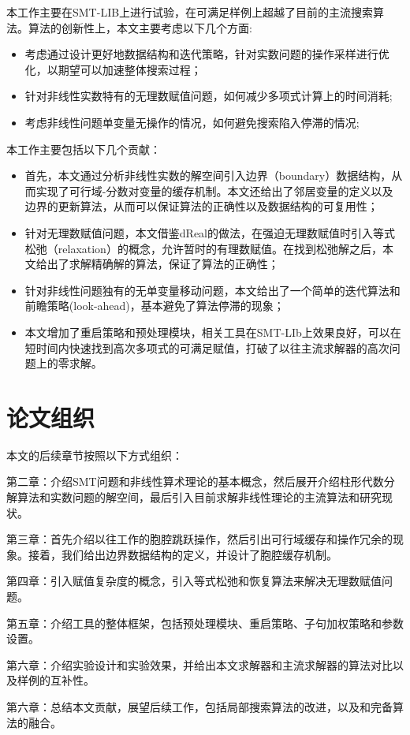 本工作主要在SMT-LIB\cite{BarFT-SMTLIB}上进行试验，在可满足样例上超越了目前的主流搜索算法。算法的创新性上，本文主要考虑以下几个方面:
\begin{itemize}
    \item 考虑通过设计更好地数据结构和迭代策略，针对实数问题的操作采样进行优化，以期望可以加速整体搜索过程；
    \item 针对非线性实数特有的无理数赋值问题，如何减少多项式计算上的时间消耗;
    \item 考虑非线性问题单变量无操作的情况，如何避免搜索陷入停滞的情况;
\end{itemize}

本工作主要包括以下几个贡献：
\begin{itemize}
    \item 首先，本文通过分析非线性实数的解空间引入边界（boundary）数据结构，从而实现了可行域-分数对变量的缓存机制。本文还给出了邻居变量的定义以及边界的更新算法，从而可以保证算法的正确性以及数据结构的可复用性；
    \item 针对无理数赋值问题，本文借鉴dReal的做法，在强迫无理数赋值时引入等式松弛（relaxation）的概念，允许暂时的有理数赋值。在找到松弛解之后，本文给出了求解精确解的算法，保证了算法的正确性；
    \item 针对非线性问题独有的无单变量移动问题，本文给出了一个简单的迭代算法和前瞻策略(look-ahead)，基本避免了算法停滞的现象；
    \item 本文增加了重启策略和预处理模块，相关工具在SMT-LIb上效果良好，可以在短时间内快速找到高次多项式的可满足赋值，打破了以往主流求解器的高次问题上的零求解。
\end{itemize}

\section{论文组织}
本文的后续章节按照以下方式组织：

第二章：介绍SMT问题和非线性算术理论的基本概念，然后展开介绍柱形代数分解算法和实数问题的解空间，最后引入目前求解非线性理论的主流算法和研究现状。

第三章：首先介绍以往工作的胞腔跳跃操作，然后引出可行域缓存和操作冗余的现象。接着，我们给出边界数据结构的定义，并设计了胞腔缓存机制。

第四章：引入赋值复杂度的概念，引入等式松弛和恢复算法来解决无理数赋值问题。

第五章：介绍工具的整体框架，包括预处理模块、重启策略、子句加权策略和参数设置。

第六章：介绍实验设计和实验效果，并给出本文求解器和主流求解器的算法对比以及样例的互补性。

第六章：总结本文贡献，展望后续工作，包括局部搜索算法的改进，以及和完备算法的融合。